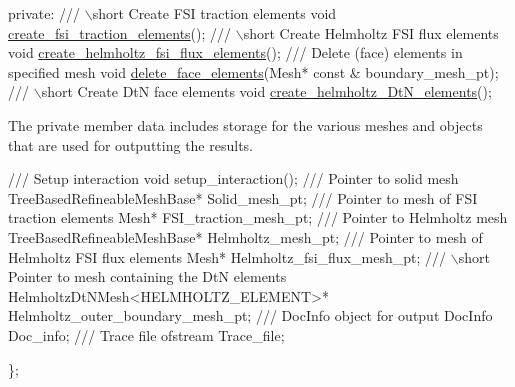 \begin{DoxyCodeInclude}
\textcolor{keyword}{private}:
\textcolor{comment}{}
\textcolor{comment}{ /// \(\backslash\)short Create FSI traction elements}
\textcolor{comment}{} \textcolor{keywordtype}{void} \hyperlink{classCoatedDiskProblem_a143908e8db74ad6bd8b7efaaa26c78c3}{create\_fsi\_traction\_elements}();
 \textcolor{comment}{}
\textcolor{comment}{ /// \(\backslash\)short Create Helmholtz FSI flux elements}
\textcolor{comment}{} \textcolor{keywordtype}{void} \hyperlink{classCoatedDiskProblem_a34f61c03b152f2ac06e1e771b0dbe09b}{create\_helmholtz\_fsi\_flux\_elements}();
 \textcolor{comment}{}
\textcolor{comment}{ /// Delete (face) elements in specified mesh }
\textcolor{comment}{} \textcolor{keywordtype}{void} \hyperlink{classCoatedDiskProblem_a55b4cead41e01ab5fd728b607f62bb74}{delete\_face\_elements}(Mesh* \textcolor{keyword}{const} & boundary\_mesh\_pt);
 \textcolor{comment}{}
\textcolor{comment}{ /// \(\backslash\)short Create DtN face elements }
\textcolor{comment}{} \textcolor{keywordtype}{void} \hyperlink{classCoatedDiskProblem_a222b74395afde602617965f60c885491}{create\_helmholtz\_DtN\_elements}();

\end{DoxyCodeInclude}


The private member data includes storage for the various meshes and objects that are used for outputting the results.


\begin{DoxyCodeInclude}
\textcolor{comment}{}
\textcolor{comment}{ /// Setup interaction}
\textcolor{comment}{} \textcolor{keywordtype}{void} setup\_interaction();
\textcolor{comment}{}
\textcolor{comment}{ /// Pointer to solid mesh}
\textcolor{comment}{} TreeBasedRefineableMeshBase* Solid\_mesh\_pt;
\textcolor{comment}{}
\textcolor{comment}{ /// Pointer to mesh of FSI traction elements}
\textcolor{comment}{} Mesh* FSI\_traction\_mesh\_pt;
\textcolor{comment}{}
\textcolor{comment}{ /// Pointer to Helmholtz mesh}
\textcolor{comment}{} TreeBasedRefineableMeshBase* Helmholtz\_mesh\_pt;
\textcolor{comment}{}
\textcolor{comment}{ /// Pointer to mesh of Helmholtz FSI flux elements}
\textcolor{comment}{} Mesh* Helmholtz\_fsi\_flux\_mesh\_pt;
 \textcolor{comment}{}
\textcolor{comment}{ /// \(\backslash\)short Pointer to mesh containing the DtN elements}
\textcolor{comment}{} HelmholtzDtNMesh<HELMHOLTZ\_ELEMENT>* Helmholtz\_outer\_boundary\_mesh\_pt;
 \textcolor{comment}{}
\textcolor{comment}{ /// DocInfo object for output}
\textcolor{comment}{} DocInfo Doc\_info;
\textcolor{comment}{}
\textcolor{comment}{ /// Trace file}
\textcolor{comment}{} ofstream Trace\_file;

\};

\end{DoxyCodeInclude}




